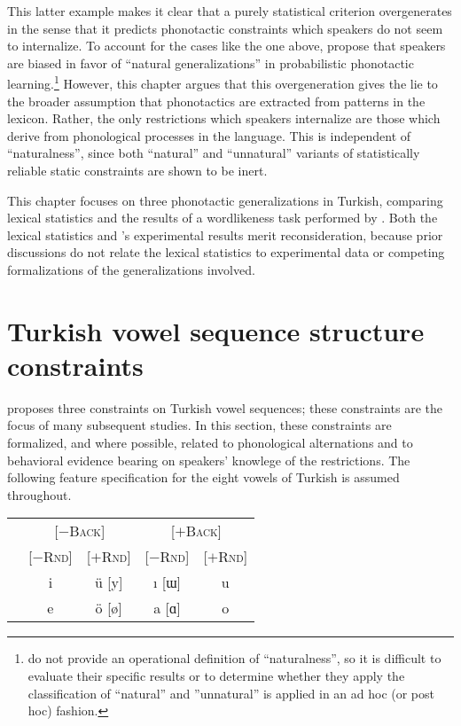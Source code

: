 This latter example makes it clear that a purely statistical criterion overgenerates in the sense that it predicts phonotactic constraints which speakers do not seem to internalize.
To account for the cases like the one above, \citet{HayesInPress} propose that speakers are biased in favor of ``natural generalizations'' in probabilistic phonotactic learning.\footnote{
    \citeauthor{HayesInPress} do not provide an operational definition of ``naturalness'', so it is difficult to evaluate their specific results or to determine whether they apply the classification of ``natural'' and ''unnatural'' is applied in an ad hoc (or post hoc) fashion.}
However, this chapter argues that this overgeneration gives the lie to the broader assumption that phonotactics are extracted from patterns in the lexicon.
Rather, the only restrictions which speakers internalize are those which derive from phonological processes in the language.
This is independent of ``naturalness'', since both ``natural'' and ``unnatural'' variants of statistically reliable static constraints are shown to be inert.

This chapter focuses on three phonotactic generalizations in Turkish, comparing lexical statistics and the results of a wordlikeness task performed by \citet{Zimmer1969}.
Both the lexical statistics and \citeauthor{Zimmer1969}'s experimental results merit reconsideration, because prior discussions do not relate the lexical statistics to experimental data or competing formalizations of the generalizations involved.

\section{Turkish vowel sequence structure constraints}

\citet{Lees1966b,Lees1966a} proposes three constraints on Turkish vowel sequences; these constraints are the focus of many subsequent studies. In this section, these constraints are formalized, and where possible, related to phonological alternations and to behavioral evidence bearing on speakers' knowlege of the restrictions. The following feature specification for the eight vowels of Turkish is assumed throughout.

\begin{example}
\begin{tabular}{c c c c c}
                       & \multicolumn{2}{c}{[$-$\textsc{Back}]} & \multicolumn{2}{c}{[$+$\textsc{Back}]} \\
                       & [$-$\textsc{Rnd}] & [$+$\textsc{Rnd}] & [$-$\textsc{Rnd}] & [$+$\textsc{Rnd}] \\ 
\cmidrule{2-5}
 & {i} & {ü} [y] & {ı} [ɯ] & {u} \\
 & {e} & {ö} [ø] & {a} [ɑ] & {o} \\
\end{tabular}
\end{example}

